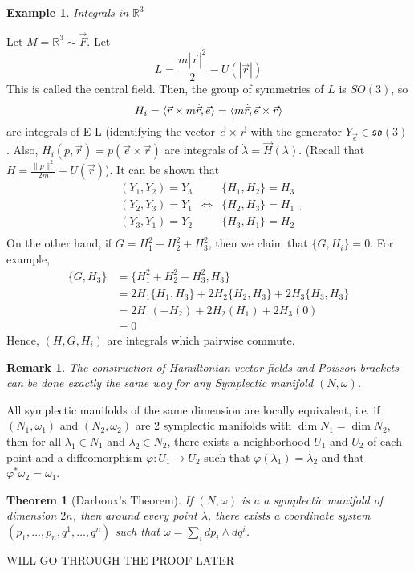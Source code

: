 \documentclass{article}
\newcommand{\R}{\mathbb R}
\newcommand{\vhi}{\varphi}
\newcommand{\w}{\omega}
\DeclarePairedDelimiter{\ang}{\langle}{\rangle}
\newtheorem{thm}{Theorem}
\newtheorem{ex}{Example}
\newtheorem{rk}{Remark}
\begin{document}
\begin{ex}
    Integrals in $\R^3$
\end{ex}
Let $M=\R^3\sim \vec F$. Let
\[L = \frac{m|\vec r|^2}{2} - U(|\vec r|)\]
This is called the central field. Then, the group of symmetries of $L$ is $SO(3)$, so 
\[H_i = \ang{\vec r\times m\dot{\vec r},\vec{e}} = \ang{m\dot{\vec r},\vec{e}\times\vec r}\]
are integrals of E-L (identifying the vector $\vec e\times \vec r$ with the generator $Y_{\vec{e}}\in\mathfrak{so}(3)$. Also, $H_i(p,\vec r) = p(\vec e\times \vec {r})$ are integrals of $\dot\lambda = \vec H(\lambda)$. (Recall that $H = \frac{\|p\|^2}{2m} + U(\vec r)$). It can be shown that
\[\begin{array}{ccc}
     (Y_1,Y_2) = Y_3 & & \{H_1,H_2\} = H_3\\
     (Y_2,Y_3) = Y_1 &\Leftrightarrow & \{H_2,H_3\} = H_1\\
     (Y_3,Y_1) = Y_2 & & \{H_3,H_1\} = H_2\\
\end{array}.\]
On the other hand, if $G = H_1^2 + H_2^2 + H_3^2$, then we claim that $\{G,H_i\} = 0$. For example,
\begin{align*}
    \{G,H_3\} &= \{H_1^2 + H_2^2 + H_3^2, H_3\}\\
    &=2H_1\{H_1,H_3\} + 2H_2\{H_2,H_3\} + 2H_3\{H_3,H_3\}\\
    &=2H_1(-H_2) + 2H_2(H_1) + 2H_3(0)\\
    &=0
\end{align*}
Hence, $(H,G,H_i)$ are integrals which pairwise commute.
\begin{rk}
    The construction of Hamiltonian vector fields and Poisson brackets can be done exactly the same way for any Symplectic manifold $(N,\w)$.
\end{rk}
All symplectic manifolds of the same dimension are locally equivalent, i.e. if $(N_1,\w_1)$ and $(N_2,\w_2)$ are 2 symplectic manifolds with $\dim N_1 = \dim N_2$, then for all $\lambda_1\in N_1$ and $\lambda_2\in N_2$, there exists a neighborhood $U_1$ and $U_2$ of each point and a diffeomorphism $\vhi:U_1\to U_2$ such that $\vhi(\lambda_1) = \lambda_2$ and that $\vhi^*\w_2 = \w_1$.
\begin{thm}[Darboux's Theorem]
    If $(N,\w)$ is a a symplectic manifold of dimension $2n$, then around every point $\lambda$, there exists a coordinate system $(p_1,\dots, p_n,q^1,\dots, q^n)$ such that $\w = \sum_i dp_i\wedge dq^i$.
\end{thm}
WILL GO THROUGH THE PROOF LATER
\end{document}
